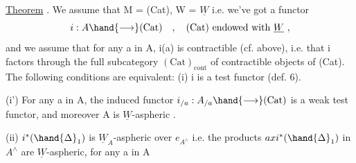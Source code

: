 \uline{Theorem} . We assume that M = (Cat), W = $\underline{W}$ i.e. we've got a functor
\[ i: A \hand{\longrightarrow} (\mathrm{Cat}) \quad , \quad (\mathrm{Cat}) \text{ endowed with } \underline{W} \ , \]
and we assume that for any a in A, i(a) is contractible (cf. above), i.e.
that i factors through the full subcategory $(\mathrm{Cat})_{\mathrm{cont}}$ of contractible
objects of (Cat). The following conditions are equivalent:
(i) i is a test functor (def. 6).

(i') For any a in A, the induced functor $i_{/a} : A_{/a} \hand{\longrightarrow} (\mathrm{Cat})$ is a
weak test functor, and moreover A is $\underline{W}$-aspheric .

(ii) $i^*(\hand{\Delta}_1)$ is $\underline{W}_A$-aspheric over $e_{A^{\wedge}}$ i.e. the products $axi^*(\hand{\Delta}_1)$
in $A^{\wedge}$ are $\underline{W}$-aspheric, for any a in A

